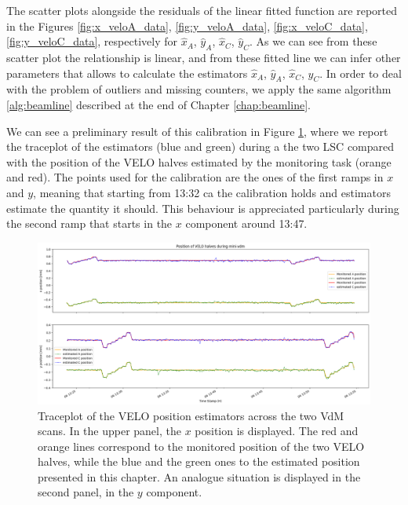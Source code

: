 The scatter plots alongside the residuals of the linear fitted function are reported in the Figures \ref{fig:x_veloA_data}, \ref{fig:y_veloA_data}, \ref{fig:x_veloC_data}, \ref{fig:y_veloC_data}, respectively for $\hat{x}_A$, $\hat{y}_A$, $\hat{x}_C$, $\hat{y}_C$. As we can see from these scatter plot the relationship is linear, and from these fitted line we can infer other parameters that allows to calculate the estimators $\hat{x}_A$, $\hat{y}_A$, $\hat{x}_C$, $\hat{y}_C$. In order to deal with the problem of outliers and missing counters, we apply the same algorithm \ref{alg:beamline} described at the end of Chapter \ref{chap:beamline}. 

We can see a preliminary result of this calibration in Figure \ref{fig:traceplot_xy}, where we report the traceplot of the estimators (blue and green) during a the two LSC compared with the position of the VELO halves estimated by the monitoring task (orange and red). The points used for the calibration are the ones of the first ramps in $x$ and $y$, meaning that starting from 13:32 ca the calibration holds and estimators estimate the quantity it should. This behaviour is appreciated particularly during the second ramp that starts in the $x$ component around 13:47.

\begin{figure}
    \centering
    \includegraphics[width=\textwidth]{figures/traceplot_xy.png}
    \caption{Traceplot of the VELO position estimators across the two VdM scans. In the upper panel, the $x$ position is displayed. The red and orange lines correspond to the monitored position of the two VELO halves, while the blue and the green ones to the estimated position presented in this chapter. An analogue situation is displayed in the second panel, in the $y$ component.}
    \label{fig:traceplot_xy}
\end{figure}

